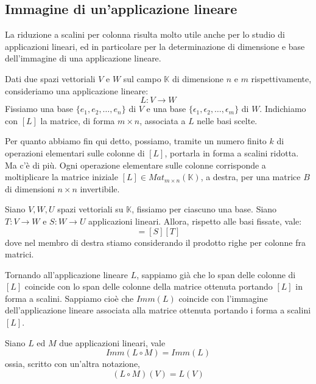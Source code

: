 
\subsection{Immagine di un'applicazione lineare}

La riduzione a scalini per colonna risulta molto utile anche per lo
studio di applicazioni lineari, ed in particolare per la
determinazione di dimensione e base dell'immagine di una applicazione
lineare.

Dati due spazi vettoriali $V$ e $W$ sul campo $\mathbb{K}$ di dimensione $n$
e $m$ rispettivamente, consideriamo una applicazione lineare:
\begin{equation*}
	L : V \to W
\end{equation*}
Fissiamo una base $\{e_1, e_2, \dots, e_n\}$ di $V$ e una base
$\{\epsilon_1, \epsilon_2, \dots, \epsilon_m\}$ di $W$. Indichiamo con $[L]$
la matrice, di forma $m \times n$, associata a $L$ nelle basi scelte.

Per quanto abbiamo fin qui detto, possiamo, tramite un numero finito $k$ di
operazioni elementari sulle colonne di $[L]$, portarla in forma a scalini
ridotta. Ma c'\`e di pi\`u. Ogni operazione elementare sulle colonne corrisponde
a moltiplicare la matrice iniziale $[L] \in Mat_{m \times n}(\mathbb{K})$,
a destra, per una matrice $B$ di dimensioni $n \times n$ invertibile.

\begin{theorem}
	Siano $V, W, U$ spazi vettoriali su $\mathbb{K}$, fissiamo per ciascuno
	una base. Siano $T : V \to W$ e $S : W \to U$ applicazioni lineari. Allora,
	rispetto alle basi fissate, vale:
	\begin{equation*}
		[S \circ T] = [S][T]
	\end{equation*}
	dove nel membro di destra stiamo considerando il prodotto righe per colonne
	fra matrici.
\end{theorem}

Tornando all'applicazione lineare $L$, sappiamo già che lo span delle colonne
di $[L]$ coincide con lo span delle colonne della matrice ottenuta portando $[L]$
in forma a scalini. Sappiamo cio\`e che $Imm(L)$ coincide con l'immagine
dell'applicazione lineare associata alla matrice ottenuta portando i forma a
scalini $[L]$.

\begin{proposition}
	Siano $L$ ed $M$ due applicazioni lineari, vale
	\[ Imm(L \circ M) = Imm(L) \]
	ossia, scritto con un'altra notazione,
	\[ (L \circ M)(V) = L(V) \]
\end{proposition}

